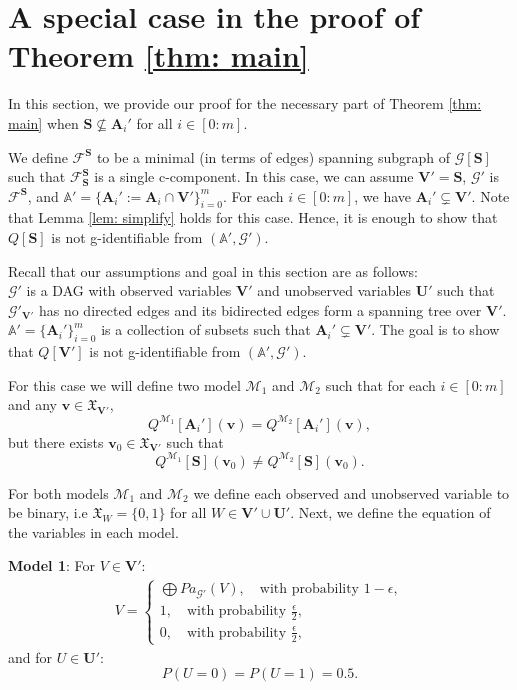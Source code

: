 \documentclass[accepted]{uai2022}
\newcommand{\Pa}[2]{\textit{Pa}_{#2}(#1)}
\newcommand{\V}[0]{\mathbf{V}}
\newcommand{\U}[0]{\mathbf{U}}
\newcommand{\A}[0]{\mathbf{A}}
\newcommand{\G}[0]{\mathcal{G}}
\newcommand{\M}[0]{\mathcal{M}}
\newcommand{\F}[0]{\mathcal{F}}
\newcommand{\dom}[1]{\mathfrak{X}_{#1}}
\begin{document}
\section{A special case in the proof of Theorem \ref{thm: main}} \label{sec: apd_second case}
    In this section, we provide our proof for the necessary part of Theorem \ref{thm: main} when $\mathbf{S}\nsubseteq \A_i'$ for all $i\in [0:m]$. 
     
    We define $\F^{\mathbf{S}}$ to be a minimal (in terms of edges) spanning subgraph of $\G[\mathbf{S}]$ such that $\F^{\mathbf{S}}_{\mathbf{S}}$ is a single c-component. 
    In this case, we can assume $\V' = \mathbf{S}$, $\G'$ is $\F^{\mathbf{S}}$, and $\mathbb{A}'= \{\A_i':=\A_i \cap \V'\}_{i=0}^m$. 
    For each $i\in [0:m]$, we have $\A_i' \subsetneq \V'$. %
    Note that Lemma \ref{lem: simplify} holds for this case. 
    Hence, it is enough to show that $Q[\mathbf{S}]$ is not g-identifiable from $(\mathbb{A}', \G')$. 
    
    Recall that our assumptions and goal in this section are as follows:\\
    $\G'$ is a DAG with observed variables $\V'$ and unobserved variables $\U'$ such that $\G'_{\V'}$ has no directed edges and its bidirected edges form a spanning tree over $\V'$. 
    $\mathbb{A}'= \{\A_i'\}_{i=0}^m$ is a collection of subsets such that $\A_i' \subsetneq \V'$. 
    The goal is to show that $Q[\V']$ is not g-identifiable from $(\mathbb{A}',\G')$.

    For this case we will define two model $\M_1$ and $\M_2$ such that for each $i\in [0:m]$ and any $\mathbf{v}\in \dom{\V'}$,
    \begin{equation*}
        Q^{\M_1}[\A_i'](\mathbf{v}) = Q^{\M_2}[\A_i'](\mathbf{v}),
    \end{equation*}
    but there exists $\mathbf{v}_0\in \dom{\V'}$ such that
    \begin{equation*}
        Q^{\M_1}[\mathbf{S}](\mathbf{v}_0) \neq Q^{\M_2}[\mathbf{S}](\mathbf{v}_0).
    \end{equation*}
    
    For both models $\M_1$ and $\M_2$ we define each observed and unobserved variable to be binary, i.e $\dom{W}=\{0, 1\}$ for all $W \in \V' \cup \U'$.
    Next, we define the equation of the variables in each model. 
    
    \textbf{Model 1}: For $V \in \V'$:
    \begin{align}
        V = 
        \begin{cases}
            \bigoplus \Pa{V}{\G'}, \quad \text{with probability } 1-\epsilon,\\
            1, \quad \text{with probability } \frac{\epsilon}{2},\\
            0, \quad \text{with probability } \frac{\epsilon}{2},
        \end{cases}
    \end{align}
    and for $U \in \U'$:
    \begin{equation*}
        P(U=0)= P(U=1) = 0.5.
    \end{equation*}
    
\end{document}
